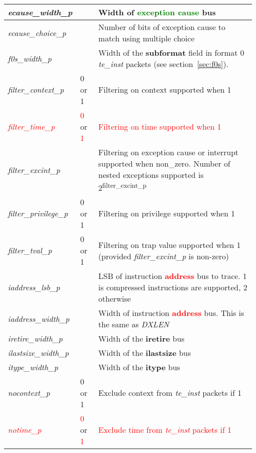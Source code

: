 \begin{table}[h]
\begin{tabulary}{\textwidth}{|l|l|p{100mm}|}
        \hline
        \textit{ecause\_width\_p} &  & Width of \textcolor{green}{\textbf{exception cause}} bus \\
        \hline
        \textit{ecause\_choice\_p} & & Number of bits of exception cause to match using multiple choice \\
        \hline
        \textit{f0s\_width\_p} & & Width of the \textbf{subformat} field in format 0 \textit{te\_inst} packets (see section~\ref{sec:f0s}). \\
        \hline
        \textit{filter\_context\_p} & 0 or 1 & Filtering on context supported when 1 \\
        \hline
        \textcolor{red}{\textit{filter\_time\_p}} & \textcolor{red}{0} or \textcolor{red}{1} & \textcolor{red}{Filtering on time supported when 1} \\
        \hline
        \textit{filter\_excint\_p} & & Filtering on exception cause or interrupt supported when non\_zero.  Number of nested exceptions supported is 2\textsuperscript{filter\_excint\_p} \\
        \hline
        \textit{filter\_privilege\_p} & 0 or 1 & Filtering on privilege supported when 1 \\
        \hline
        \textit{filter\_tval\_p} & 0 or 1 & Filtering on trap value supported when 1 (provided \textit{filter\_excint\_p} is non-zero) \\
        \hline
        \textit{iaddress\_lsb\_p} & & LSB of instruction \textcolor{red}{\textbf{address}} bus to trace.  1 is compressed instructions are supported, 2 otherwise\\
        \hline
        \textit{iaddress\_width\_p} & & Width of instruction \textcolor{red}{\textbf{address}} bus. This is the same as \textit{DXLEN}\\
        \hline
        \textit{iretire\_width\_p} & & Width of the \textbf{iretire} bus\\
        \hline
        \textit{ilastsize\_width\_p} & & Width of the \textbf{ilastsize} bus\\
        \hline
        \textit{itype\_width\_p} & & Width of the \textbf{itype} bus\\
        \hline
        \textit{nocontext\_p} & 0 or 1 & Exclude context from \textit{te\_inst} packets if 1 \\
        \hline
        \textcolor{red}{\textit{notime\_p}} & \textcolor{red}{0} or \textcolor{red}{1} & \textcolor{red}{Exclude time from \textit{te\_inst} packets if 1} \\

\end{tabulary}
\end{table}
